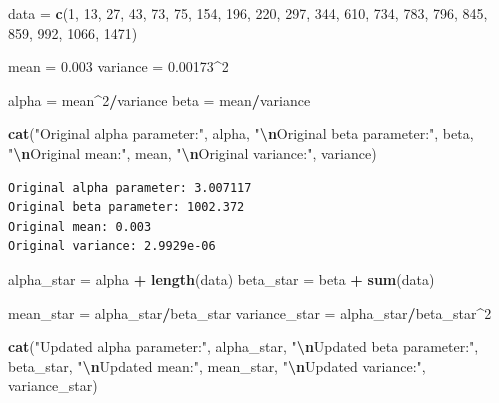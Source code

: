 \documentclass[
]{article}
\newenvironment{Shaded}{\begin{snugshade}}{\end{snugshade}}
\newcommand{\DecValTok}[1]{\textcolor[rgb]{0.00,0.00,0.81}{#1}}
\newcommand{\FloatTok}[1]{\textcolor[rgb]{0.00,0.00,0.81}{#1}}
\newcommand{\FunctionTok}[1]{\textcolor[rgb]{0.13,0.29,0.53}{\textbf{#1}}}
\newcommand{\NormalTok}[1]{#1}
\newcommand{\OtherTok}[1]{\textcolor[rgb]{0.56,0.35,0.01}{#1}}
\newcommand{\SpecialCharTok}[1]{\textcolor[rgb]{0.81,0.36,0.00}{\textbf{#1}}}
\newcommand{\StringTok}[1]{\textcolor[rgb]{0.31,0.60,0.02}{#1}}
\begin{document}
\begin{Shaded}
\begin{Highlighting}[]
\NormalTok{data }\OtherTok{=} \FunctionTok{c}\NormalTok{(}\DecValTok{1}\NormalTok{, }\DecValTok{13}\NormalTok{, }\DecValTok{27}\NormalTok{, }\DecValTok{43}\NormalTok{, }\DecValTok{73}\NormalTok{, }\DecValTok{75}\NormalTok{, }\DecValTok{154}\NormalTok{, }\DecValTok{196}\NormalTok{, }\DecValTok{220}\NormalTok{, }\DecValTok{297}\NormalTok{,}
    \DecValTok{344}\NormalTok{, }\DecValTok{610}\NormalTok{, }\DecValTok{734}\NormalTok{, }\DecValTok{783}\NormalTok{, }\DecValTok{796}\NormalTok{, }\DecValTok{845}\NormalTok{, }\DecValTok{859}\NormalTok{, }\DecValTok{992}\NormalTok{, }\DecValTok{1066}\NormalTok{, }\DecValTok{1471}\NormalTok{)}

\NormalTok{mean }\OtherTok{=} \FloatTok{0.003}
\NormalTok{variance }\OtherTok{=} \FloatTok{0.00173}\SpecialCharTok{\^{}}\DecValTok{2}

\NormalTok{alpha }\OtherTok{=}\NormalTok{ mean}\SpecialCharTok{\^{}}\DecValTok{2}\SpecialCharTok{/}\NormalTok{variance}
\NormalTok{beta }\OtherTok{=}\NormalTok{ mean}\SpecialCharTok{/}\NormalTok{variance}

\FunctionTok{cat}\NormalTok{(}\StringTok{"Original alpha parameter:"}\NormalTok{, alpha, }\StringTok{"}\SpecialCharTok{\textbackslash{}n}\StringTok{Original beta parameter:"}\NormalTok{,}
\NormalTok{    beta, }\StringTok{"}\SpecialCharTok{\textbackslash{}n}\StringTok{Original mean:"}\NormalTok{, mean, }\StringTok{"}\SpecialCharTok{\textbackslash{}n}\StringTok{Original variance:"}\NormalTok{,}
\NormalTok{    variance)}
\end{Highlighting}
\end{Shaded}

\begin{verbatim}
Original alpha parameter: 3.007117 
Original beta parameter: 1002.372 
Original mean: 0.003 
Original variance: 2.9929e-06
\end{verbatim}

\begin{Shaded}
\begin{Highlighting}[]
\NormalTok{alpha\_star }\OtherTok{=}\NormalTok{ alpha }\SpecialCharTok{+} \FunctionTok{length}\NormalTok{(data)}
\NormalTok{beta\_star }\OtherTok{=}\NormalTok{ beta }\SpecialCharTok{+} \FunctionTok{sum}\NormalTok{(data)}

\NormalTok{mean\_star }\OtherTok{=}\NormalTok{ alpha\_star}\SpecialCharTok{/}\NormalTok{beta\_star}
\NormalTok{variance\_star }\OtherTok{=}\NormalTok{ alpha\_star}\SpecialCharTok{/}\NormalTok{beta\_star}\SpecialCharTok{\^{}}\DecValTok{2}

\FunctionTok{cat}\NormalTok{(}\StringTok{"Updated alpha parameter:"}\NormalTok{, alpha\_star, }\StringTok{"}\SpecialCharTok{\textbackslash{}n}\StringTok{Updated beta parameter:"}\NormalTok{,}
\NormalTok{    beta\_star, }\StringTok{"}\SpecialCharTok{\textbackslash{}n}\StringTok{Updated mean:"}\NormalTok{, mean\_star, }\StringTok{"}\SpecialCharTok{\textbackslash{}n}\StringTok{Updated variance:"}\NormalTok{,}
\NormalTok{    variance\_star)}
\end{Highlighting}
\end{Shaded}
\end{document}
